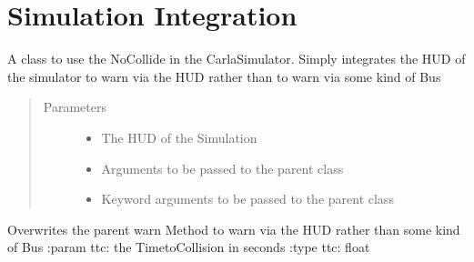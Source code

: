 \documentclass[letterpaper,10pt,english]{sphinxmanual}
\begin{document}
\chapter{Simulation Integration}
\label{\detokenize{sim_interfaces:simulation-integration}}\label{\detokenize{sim_interfaces:index-0}}\label{\detokenize{sim_interfaces::doc}}

\begin{fulllineitems}
\label{\detokenize{sim_interfaces:lib.sim_interfaces.SimNoCollide}}
A class to use the NoCollide in the Carla\sphinxhyphen{}Simulator. Simply integrates the HUD of the simulator to warn via the
HUD rather than to warn via some kind of Bus
\begin{quote}\begin{description}
\item[{Parameters}] \leavevmode\begin{itemize}
\item {} 
 \textendash{} The HUD of the Simulation

\item {} 
 \textendash{} Arguments to be passed to the parent class

\item {} 
 \textendash{} Keyword arguments to be passed to the parent class

\end{itemize}

\end{description}\end{quote}

\begin{fulllineitems}
\label{\detokenize{sim_interfaces:lib.sim_interfaces.SimNoCollide.warn}}
Overwrites the parent warn Method to warn via the HUD rather than some kind of Bus
:param ttc: the Time\sphinxhyphen{}to\sphinxhyphen{}Collision in seconds
:type ttc: float

\end{fulllineitems}


\end{fulllineitems}
\end{document}
